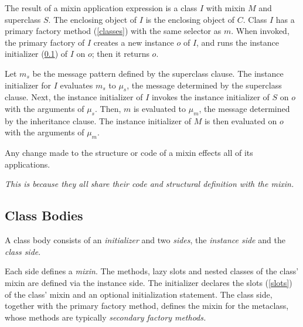 \documentclass{article}
\newcommand{\code}[1]{{\sf #1}}
\begin{document}

The result of a mixin application expression is a class $I$ with mixin $M$ and superclass $S$.
The enclosing object of $I$ is the enclosing object of $C$. 
Class $I$ has a primary factory method  (\ref{classes}) with the same selector as $m$. 
When invoked, the primary factory of $I$ creates a new instance $o$  of $I$,  and runs the instance initializer (\ref{classBodies}) of $I$ on $o$; then it returns $o$. 

Let $m_s$ be the message pattern defined by the superclass clause.
The instance initializer for $I$ evaluates $m_s$ to $\mu_s$, the message determined by the superclass clause.  Next, the instance initializer of $I$ invokes the instance initializer  of $S$ on $o$ with the arguments of $\mu_s$. Then, $m$ is evaluated to $\mu_m$, the message determined by the inheritance clause. The instance initializer of $M$ is then  evaluated on $o$ with the arguments of $\mu_m$. 


Any change made to the structure or code of a mixin effects all of its applications.

{\it This is because they all share their code and structural definition with the mixin.}
 

\subsection{Class Bodies}
\label{classBodies}

A class body consists of an {\em initializer} and two {\em sides}, the {\em instance side} and the {\em class side}.

Each side defines a {\em mixin}. 
The methods, lazy slots 
and nested classes of the class'  mixin are defined via the instance side. The initializer declares the slots (\ref{slots}) of the class'   mixin and an optional initialization statement.
The class side, together with the primary factory method,  defines the mixin for the metaclass, whose methods are typically {\em secondary factory methods.} 
\end{document}
